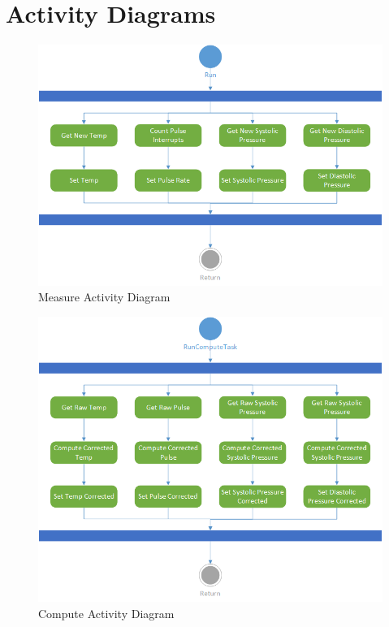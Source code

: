 \documentclass[12pt]{article} %
\begin{document}
    \section{Activity Diagrams}

    \begin{figure}[H]
      \centering
      \includegraphics[width=\textwidth]{../design/measure_activity.png}
      \caption{Measure Activity Diagram}
      \label{fig:measureActivity}
    \end{figure}

    \begin{figure}[H]
      \centering
      \includegraphics[width=\textwidth]{../design/compute_activity.png}
      \caption{Compute Activity Diagram}
      \label{fig:computeActivity}
    \end{figure}
\end{document}
